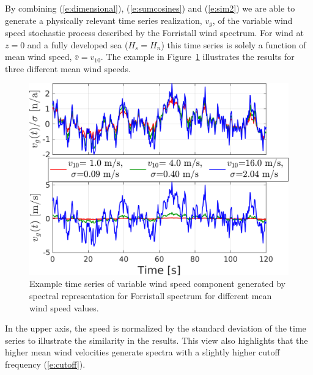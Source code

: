 \documentclass[utf8]{frontiersSCNS} %
\begin{document}
By combining (\ref{e:dimensional}), (\ref{e:sumcosines}) and (\ref{e:sim2}) we are able to generate a physically relevant time series realization, $v_g$, of the variable wind speed stochastic process described by the Forristall wind spectrum. For wind at $z=0$ and a fully developed sea ($H_s=H_n$) this time series is solely a function of mean wind speed, $\bar{v}=v_{10}$. The example in Figure~\ref{f:forristall} illustrates the results for three different mean wind speeds.
\begin{figure}[h!]
  \centering
  \includegraphics[width=\SFc\textwidth]{src/foristall_time_ex.png}
  \caption{Example time series of variable wind speed component generated by spectral representation for Forristall spectrum for different mean wind speed values.}
  \label{f:forristall}
\end{figure}
In the upper axis, the speed is normalized by the standard deviation of the time series to illustrate the similarity in the results. This view also highlights that the higher mean wind velocities generate spectra with a slightly higher cutoff frequency (\ref{e:cutoff}).
%
\end{document}
